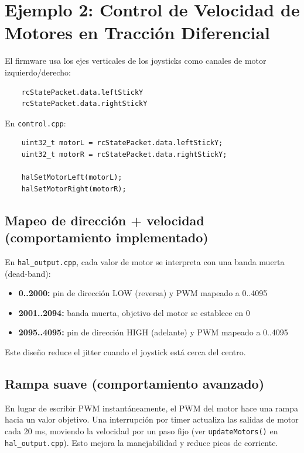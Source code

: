 \section{Ejemplo 2: Control de Velocidad de Motores en Tracción Diferencial}
\label{sec:example-motors}

El firmware usa los ejes verticales de los joysticks como canales de motor izquierdo/derecho:

\begin{verbatim}
    rcStatePacket.data.leftStickY
    rcStatePacket.data.rightStickY
\end{verbatim}

En \texttt{control.cpp}:

\begin{verbatim}
    uint32_t motorL = rcStatePacket.data.leftStickY;
    uint32_t motorR = rcStatePacket.data.rightStickY;

    halSetMotorLeft(motorL);
    halSetMotorRight(motorR);
\end{verbatim}

\subsection{Mapeo de dirección + velocidad (comportamiento implementado)}
En \texttt{hal\_output.cpp}, cada valor de motor se interpreta con una banda muerta (dead-band):

\begin{itemize}
    \item \textbf{0..2000:} pin de dirección LOW (reversa) y PWM mapeado a 0..4095
    \item \textbf{2001..2094:} banda muerta, objetivo del motor se establece en 0
    \item \textbf{2095..4095:} pin de dirección HIGH (adelante) y PWM mapeado a 0..4095
\end{itemize}

Este diseño reduce el jitter cuando el joystick está cerca del centro.

\subsection{Rampa suave (comportamiento avanzado)}
En lugar de escribir PWM instantáneamente, el PWM del motor hace una rampa hacia un valor objetivo. Una interrupción por timer actualiza
las salidas de motor cada 20 ms, moviendo la velocidad por un paso fijo (ver \texttt{updateMotors()} en
\texttt{hal\_output.cpp}). Esto mejora la manejabilidad y reduce picos de corriente.

